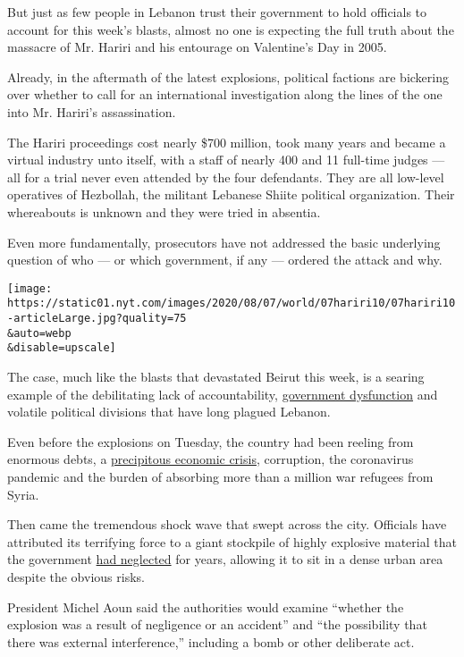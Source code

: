 But just as few people in Lebanon trust their government to hold
officials to account for this week's blasts, almost no one is expecting
the full truth about the massacre of Mr. Hariri and his entourage on
Valentine's Day in 2005.

Already, in the aftermath of the latest explosions, political factions
are bickering over whether to call for an international investigation
along the lines of the one into Mr. Hariri's assassination.

The Hariri proceedings cost nearly \$700 million, took many years and
became a virtual industry unto itself, with a staff of nearly 400 and 11
full-time judges --- all for a trial never even attended by the four
defendants. They are all low-level operatives of Hezbollah, the militant
Lebanese Shiite political organization. Their whereabouts is unknown and
they were tried in absentia.

Even more fundamentally, prosecutors have not addressed the basic
underlying question of who --- or which government, if any --- ordered
the attack and why.

\texttt{[image: https://static01.nyt.com/images/2020/08/07/world/07hariri10/07hariri10-articleLarge.jpg?quality=75\\\&auto=webp\\\&disable=upscale]}

The case, much like the blasts that devastated Beirut this week, is a
searing example of the debilitating lack of accountability,
\href{https://www.nytimes.com/2020/08/05/world/middleeast/beirut-explosion-lebanon.html}{government
dysfunction} and volatile political divisions that have long plagued
Lebanon.

Even before the explosions on Tuesday, the country had been reeling from
enormous debts, a
\href{https://www.nytimes.com/2020/05/10/world/middleeast/lebanon-economic-crisis.html}{precipitous
economic crisis}, corruption, the coronavirus pandemic and the burden of
absorbing more than a million war refugees from Syria.

Then came the tremendous shock wave that swept across the city.
Officials have attributed its terrifying force to a giant stockpile of
highly explosive material that the government
\href{https://www.nytimes.com/2020/08/05/world/middleeast/beirut-explosion-lebanon.html}{had
neglected} for years, allowing it to sit in a dense urban area despite
the obvious risks.

President Michel Aoun said the authorities would examine ``whether the
explosion was a result of negligence or an accident'' and ``the
possibility that there was external interference,'' including a bomb or
other deliberate act.

